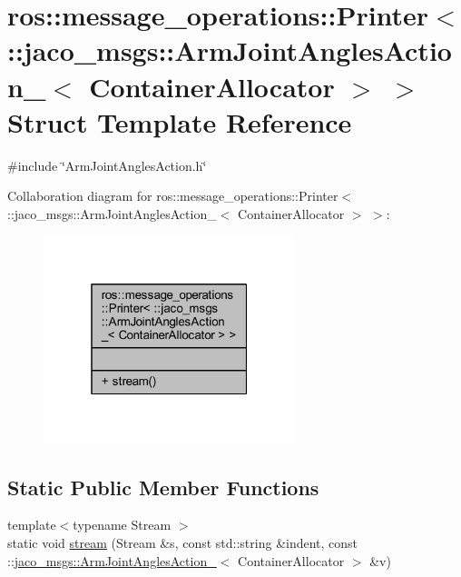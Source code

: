 \hypertarget{structros_1_1message__operations_1_1Printer_3_01_1_1jaco__msgs_1_1ArmJointAnglesAction___3_01ContainerAllocator_01_4_01_4}{}\section{ros\+:\+:message\+\_\+operations\+:\+:Printer$<$ \+:\+:jaco\+\_\+msgs\+:\+:Arm\+Joint\+Angles\+Action\+\_\+$<$ Container\+Allocator $>$ $>$ Struct Template Reference}
\label{structros_1_1message__operations_1_1Printer_3_01_1_1jaco__msgs_1_1ArmJointAnglesAction___3_01ContainerAllocator_01_4_01_4}


{\ttfamily \#include \char`\"{}Arm\+Joint\+Angles\+Action.\+h\char`\"{}}



Collaboration diagram for ros\+:\+:message\+\_\+operations\+:\+:Printer$<$ \+:\+:jaco\+\_\+msgs\+:\+:Arm\+Joint\+Angles\+Action\+\_\+$<$ Container\+Allocator $>$ $>$\+:
\nopagebreak
\begin{figure}[H]
\begin{center}
\leavevmode
\includegraphics[width=208pt]{d6/d3e/structros_1_1message__operations_1_1Printer_3_01_1_1jaco__msgs_1_1ArmJointAnglesAction___3_01Conda38722313276e5ed63bbab252457a30}
\end{center}
\end{figure}
\subsection*{Static Public Member Functions}
\begin{DoxyCompactItemize}
\item 
{\footnotesize template$<$typename Stream $>$ }\\static void \hyperlink{structros_1_1message__operations_1_1Printer_3_01_1_1jaco__msgs_1_1ArmJointAnglesAction___3_01ContainerAllocator_01_4_01_4_abc59edf3b1c543e3b9a96ed0765d6e25}{stream} (Stream \&s, const std\+::string \&indent, const \+::\hyperlink{structjaco__msgs_1_1ArmJointAnglesAction__}{jaco\+\_\+msgs\+::\+Arm\+Joint\+Angles\+Action\+\_\+}$<$ Container\+Allocator $>$ \&v)
\end{DoxyCompactItemize}


